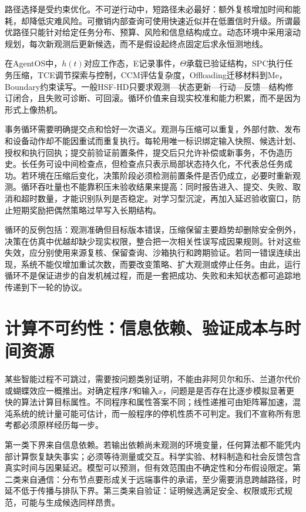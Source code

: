 路径选择是受约束优化。不可逆行动中，短路径未必最好：额外复核增加时间和能耗，却降低灾难风险。可撤销内部查询可使用快速近似并在低置信时升级。所谓最优路径只能针对给定任务分布、预算、风险和信息结构成立。动态环境中采用滚动规划，每次新观测后更新候选，而不是假设起终点固定后求永恒测地线。

在AgentOS中，$h(t)$对应工作态，E记录事件，$\Theta$承载已验证结构，SPC执行任务压缩，TCE调节探索与控制，CCM评估复杂度，Offloading迁移材料到Me，Boundary约束读写。一般HSF-HD只要求观测—状态更新—行动—反馈—结构修订闭合，且失败可诊断、可回滚。循环价值来自现实校准和能力积累，而不是因为形式上像热机。

事务循环需要明确提交点和恰好一次语义。观测与压缩可以重复，外部付款、发布和设备动作却不能因重试而重复执行。每轮用唯一标识绑定输入快照、候选计划、授权和执行回执；提交前验证前置条件，提交后只允许补偿或新事务，不伪造历史。长任务可设中间检查点，但检查点只表示局部状态持久化，不代表总任务成功。若环境在压缩后变化，决策阶段必须检测前置条件是否仍成立，必要时重新观测。循环吞吐量也不能靠积压未验收结果来提高：同时报告进入、提交、失败、取消和超时数量，才能识别队列是否稳定。对学习型沉淀，再加入延迟验收窗口，防止短期奖励把偶然策略过早写入长期结构。

循环的反例包括：观测准确但目标版本错误，压缩保留主要趋势却删除安全例外，决策在仿真中优越却缺少现实权限，整合把一次相关性误写成因果规则。针对这些失效，应分别使用来源复核、保留查询、沙箱执行和跨期验证。若同一错误连续出现，系统不能仅增加重试次数，而要改变策略、扩大观测或停止任务。由此，运行循环不是保证进步的自发机械过程，而是一套把成功、失败和未知状态都可追踪地传递到下一轮的协议。

\section{计算不可约性：信息依赖、验证成本与时间资源}
\label{sec:computational_irreducibility}

某些智能过程不可跳过，需要按问题类别证明，不能由非阿贝尔和乐、兰道尔代价或蝴蝶效应一概推出。对确定程序$P$和输入$x$，问题是是否存在比逐步模拟显著更快的算法计算目标属性。不同程序和属性答案不同；线性递推可由矩阵幂加速，混沌系统的统计量可能可估计，而一般程序的停机性质不可判定。我们不宣称所有思考都必须原样经历每一步。

第一类下界来自信息依赖。若输出依赖尚未观测的环境变量，任何算法都不能凭内部计算恢复缺失事实；必须等待测量或交互。科学实验、材料制造和社会反馈包含真实时间与因果延迟。模型可以预测，但有效范围由不确定性和分布假设限定。第二类来自通信：分布节点要形成关于远端事件的承诺，至少需要消息跨越路径，时延不低于传播与排队下界。第三类来自验证：证明候选满足安全、权限或形式规范，可能与生成候选同样昂贵。


